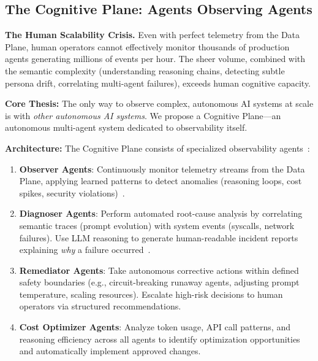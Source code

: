 \documentclass[sigplan,screen,review,9pt]{acmart}
\begin{document}
\subsection{The Cognitive Plane: Agents Observing Agents}

\textbf{The Human Scalability Crisis.} Even with perfect telemetry from the Data Plane, human operators cannot effectively monitor thousands of production agents generating millions of events per hour. The sheer volume, combined with the semantic complexity (understanding reasoning chains, detecting subtle persona drift, correlating multi-agent failures), exceeds human cognitive capacity.

\textbf{Core Thesis:} The only way to observe complex, autonomous AI systems at scale is with \emph{other autonomous AI systems}. We propose a Cognitive Plane—an autonomous multi-agent system dedicated to observability itself.

\textbf{Architecture:} The Cognitive Plane consists of specialized observability agents~\cite{Rombaut2025Watson,Kim2025AgenticInterp}:

\begin{enumerate}
  \item \textbf{Observer Agents}: Continuously monitor telemetry streams from the Data Plane, applying learned patterns to detect anomalies (reasoning loops, cost spikes, security violations)~\cite{Dong2024AgentOps}.

  \item \textbf{Diagnoser Agents}: Perform automated root-cause analysis by correlating semantic traces (prompt evolution) with system events (syscalls, network failures). Use LLM reasoning to generate human-readable incident reports explaining \emph{why} a failure occurred~\cite{Moshkovich2025Pipeline}.

  \item \textbf{Remediator Agents}: Take autonomous corrective actions within defined safety boundaries (e.g., circuit-breaking runaway agents, adjusting prompt temperature, scaling resources). Escalate high-risk decisions to human operators via structured recommendations.

  \item \textbf{Cost Optimizer Agents}: Analyze token usage, API call patterns, and reasoning efficiency across all agents to identify optimization opportunities and automatically implement approved changes.
\end{enumerate}
\end{document}
